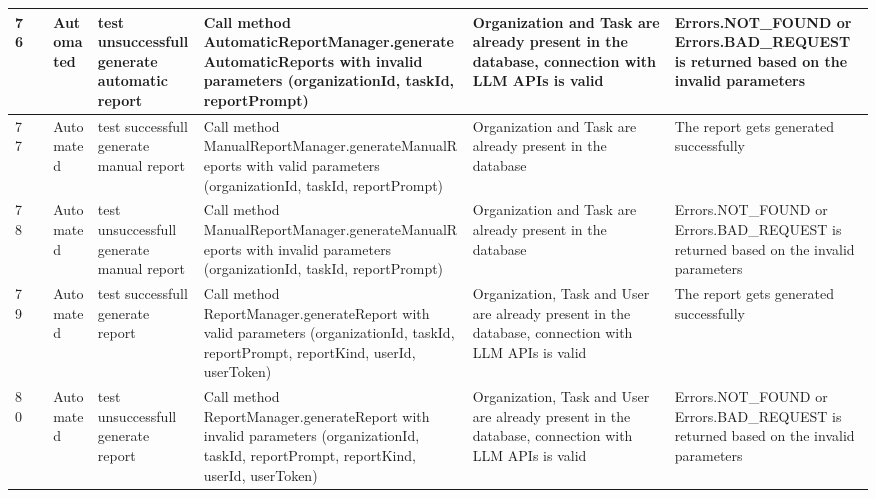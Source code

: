 \documentclass{article}
\begin{document}
{\begin{tabular}{|
      >{\columncolor[HTML]{FFFFFF}}l |
      >{\columncolor[HTML]{FFFFFF}}c |
      >{\columncolor[HTML]{FFFFFF}}l |l|l|l|l|}
    76          & \cellcolor[HTML]{FFFFFF}                                      & {\color[HTML]{11734B} Automated} & test unsuccessfull generate automatic report            & Call method AutomaticReportManager.generateAutomaticReports with invalid parameters (organizationId, taskId, reportPrompt)                                & Organization and Task are already present in the database, connection with LLM APIs is valid       & Errors.NOT\_FOUND or Errors.BAD\_REQUEST is returned based on the invalid parameters \\ \cline{1-1} \cline{3-7}
    77          & \cellcolor[HTML]{FFFFFF}                                      & {\color[HTML]{11734B} Automated} & test successfull generate manual report                 & Call method ManualReportManager.generateManualReports with valid parameters (organizationId, taskId, reportPrompt)                                        & Organization and Task are already present in the database                                          & \cellcolor[HTML]{FFFFFF}The report gets generated successfully                       \\ \cline{1-1} \cline{3-7}
    78          & \cellcolor[HTML]{FFFFFF}                                      & {\color[HTML]{11734B} Automated} & test unsuccessfull generate manual report               & Call method ManualReportManager.generateManualReports with invalid parameters (organizationId, taskId, reportPrompt)                                      & Organization and Task are already present in the database                                          & Errors.NOT\_FOUND or Errors.BAD\_REQUEST is returned based on the invalid parameters \\ \cline{1-1} \cline{3-7}
    79          & \cellcolor[HTML]{FFFFFF}                                      & {\color[HTML]{11734B} Automated} & test successfull generate report                        & Call method ReportManager.generateReport with valid parameters (organizationId, taskId, reportPrompt, reportKind, userId, userToken)                      & Organization, Task and User are already present in the database, connection with LLM APIs is valid & The report gets generated successfully                                               \\ \cline{1-1} \cline{3-7}
    80          & \multirow{-14}{*}{\cellcolor[HTML]{FFFFFF}Test ReportManager} & {\color[HTML]{11734B} Automated} & test unsuccessfull generate report                      & Call method ReportManager.generateReport with invalid parameters (organizationId, taskId, reportPrompt, reportKind, userId, userToken)                    & Organization, Task and User are already present in the database, connection with LLM APIs is valid & Errors.NOT\_FOUND or Errors.BAD\_REQUEST is returned based on the invalid parameters \\ \hline
  \end{tabular}
}
\end{document}
